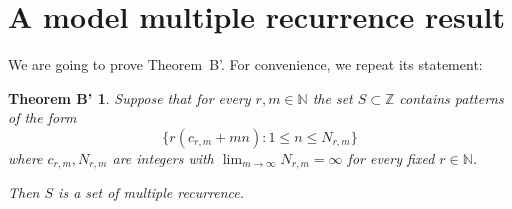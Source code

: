 \documentclass[11pt]{amsart}
\newcommand{\gG}{\Gamma}
\newcommand{\N}{\mathbb{N}}
\newcommand{\Z}{\mathbb{Z}}
\theoremstyle{plain}
\newtheorem{proposition}[theorem]{Proposition}
\newtheorem*{theoremB'}{Theorem B'}
\theoremstyle{definition}
\theoremstyle{remark}
\begin{document}




\section{A model  multiple recurrence result}\label{S:singlewarmup}
We are going to prove Theorem~B'. For convenience, we repeat its statement:
\begin{theoremB'}
  Suppose that for every $r,m\in \N$ the set $S\subset \Z$
  contains patterns of the form $$\{r(c_{r,m}+mn)\colon 1\leq
  n\leq N_{r,m}\}$$ where $c_{r,m}, N_{r,m}$ are integers with $\lim_{m\to\infty}N_{r,m}=\infty$
  for every fixed $r\in \N$.

  Then $S$ is a set of multiple recurrence.
\end{theoremB'}
\end{document}
